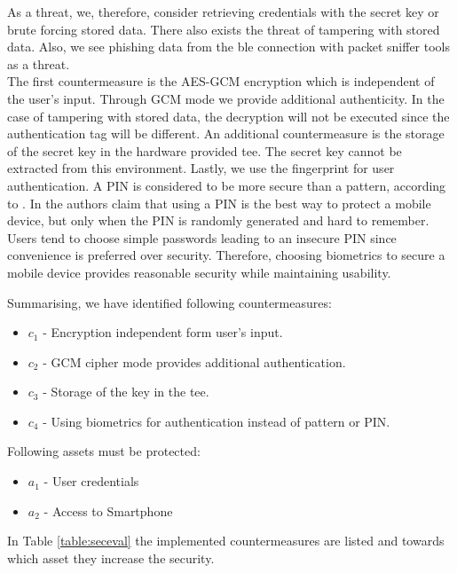 As a threat, we, therefore, consider retrieving credentials with the secret key or brute forcing stored data. There also exists the threat of tampering with stored data. Also, we see phishing data from the \gls{ble} connection with packet sniffer tools as a threat. \\
%
The first countermeasure is the AES-GCM encryption which is independent of the user's input. Through GCM mode we provide additional authenticity. In the case of tampering with stored data, the decryption will not be executed since the authentication tag will be different. An additional countermeasure is the storage of the secret key in the hardware provided \gls{tee}. The secret key cannot be extracted from this environment. Lastly, we use the fingerprint for user authentication. A PIN is considered to be more secure than a pattern, according to \cite{PinSaferThanPattern}. In \cite{SecureWayToLockPhone} the authors claim that using a PIN is the best way to protect a mobile device, but only when the PIN is randomly generated and hard to remember. Users tend to choose simple passwords leading to an insecure PIN since convenience is preferred over security. Therefore, choosing biometrics to secure a mobile device provides reasonable security while maintaining usability.

\noindent Summarising, we have identified following countermeasures:
\begin{itemize}
\item $c_1$ - Encryption independent form user's input.
\item $c_2$ - GCM cipher mode provides additional authentication.
\item $c_3$ - Storage of the key in the \gls{tee}.
\item $c_4$ - Using biometrics for authentication instead of pattern or PIN.
\end{itemize}
\vspace{0.5cm}

\noindent Following assets must be protected:
\begin{itemize}
\item $a_1$ - User credentials
\item $a_2$ - Access to Smartphone
\end{itemize}
\vspace{0.5cm}

In Table \ref{table:seceval} the implemented countermeasures are listed and towards which asset they increase the security. \\


